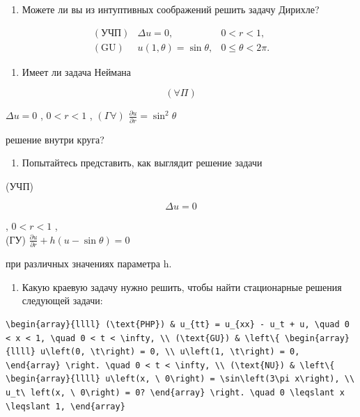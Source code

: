 \documentclass[
  ukrainian,
]{article}
\providecommand{\tightlist}{%
  \setlength{\itemsep}{0pt}\setlength{\parskip}{0pt}}
\begin{document}
\begin{enumerate}
\def\labelenumi{\arabic{enumi}.}
\tightlist
\item
  Можете ли вы из интуптивных соображений решить задачу Дирихле?
\end{enumerate}

\[
\begin{array}{llll} (\text{УЧП}) & \Delta u = 0, & 0 < r < 1, \\ (\text{GU}) & u(1, \theta) = \sin \theta, & 0 \leqslant \theta < 2\pi. \end{array}
\]

\begin{enumerate}
\def\labelenumi{\arabic{enumi}.}
\setcounter{enumi}{1}
\tightlist
\item
  Имеет ли задача Неймана
\end{enumerate}

\[
(\forall \Pi)
\]

\(\Delta u = 0\) , \(0 < r < 1\) , \((\Gamma \forall)\)
\(\frac{\partial u}{\partial r} = \sin^2 \theta\)

решение внутри круга?

\begin{enumerate}
\def\labelenumi{\arabic{enumi}.}
\setcounter{enumi}{2}
\tightlist
\item
  Попытайтесь представить, как выглядит решение задачи
\end{enumerate}

(УЧП)

\[
\Delta u = 0
\]

, \(0 < r < 1\) ,\\
(ГУ) \(\frac{\partial u}{\partial r} + h(u - \sin \theta) = 0\)

при различных значениях параметра h.

\begin{enumerate}
\def\labelenumi{\arabic{enumi}.}
\setcounter{enumi}{3}
\tightlist
\item
  Какую краевую задачу нужно решить, чтобы найти стационарные решения
  следующей задачи:
\end{enumerate}

\begin{verbatim}
\begin{array}{llll} (\text{PHP}) & u_{tt} = u_{xx} - u_t + u, \quad 0 < x < 1, \quad 0 < t < \infty, \\ (\text{GU}) & \left\{ \begin{array}{llll} u\left(0, \t\right) = 0, \\ u\left(1, \t\right) = 0, \end{array} \right. \quad 0 < t < \infty, \\ (\text{NU}) & \left\{ \begin{array}{llll} u\left(x, \ 0\right) = \sin\left(3\pi x\right), \\ u_t\ left(x, \ 0\right) = 0? \end{array} \right. \quad 0 \leqslant x \leqslant 1, \end{array}
\end{verbatim}
\end{document}
